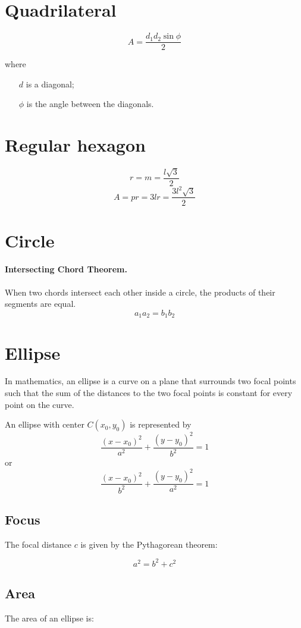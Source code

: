 \documentclass[12pt, oneside]{book}
\begin{document}
\section{Quadrilateral}
\[A = \frac{d_1 d_2 \sin{\phi}}{2}\]

where

\begin{itemize}
  \item[\(d\)] is a diagonal;
  \item[\(\phi\)] is the angle between the diagonals.
\end{itemize}

\section{Regular hexagon}

\[r = m = \frac{l \sqrt{3}}{2}\]
\[A = pr = 3 l r = \frac{3 l^2 \sqrt{3}}{2}\]

\section{Circle}
\paragraph{Intersecting Chord Theorem.} When two chords intersect each
other inside a circle, the products of their segments are equal.
\[a_1 a_2 = b_1 b_2\]

\section{Ellipse}
In mathematics, an ellipse is a curve on a plane that surrounds two focal points
such that the sum of the distances to the two focal points is constant for every
point on the curve.

An ellipse with center \(C \left( x_0, y_0 \right)\) is represented by
\[\frac{\left(x - x_0\right)^2}{a^2}+\frac{\left(y - y_0\right)^2}{b^2}=1\]
or
\[\frac{\left(x - x_0\right)^2}{b^2}+\frac{\left(y - y_0\right)^2}{a^2}=1\]
\subsection{Focus}
The focal distance \(c\) is given by the Pythagorean theorem:

\[a^2=b^2+c^2\]

\subsection{Area}
The area of an ellipse is:
\end{document}
